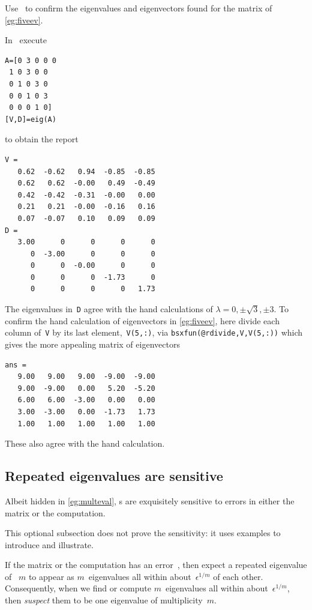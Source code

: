 \begin{example} \label{eg:fiveevm}
Use \script\ to confirm the eigenvalues and eigenvectors found for the matrix of \autoref{eg:fiveev}.
\begin{solution} 
In \script\ execute
\begin{verbatim}
A=[0 3 0 0 0
 1 0 3 0 0
 0 1 0 3 0
 0 0 1 0 3
 0 0 0 1 0]
[V,D]=eig(A)
\end{verbatim}
\setbox\ajrqrbox\hbox{}%
\marginpar{\usebox{\ajrqrbox}}%
to obtain the report \twodp
\begin{verbatim}
V =
   0.62  -0.62   0.94  -0.85  -0.85
   0.62   0.62  -0.00   0.49  -0.49
   0.42  -0.42  -0.31  -0.00   0.00
   0.21   0.21  -0.00  -0.16   0.16
   0.07  -0.07   0.10   0.09   0.09
D =
   3.00      0      0      0      0
      0  -3.00      0      0      0
      0      0  -0.00      0      0
      0      0      0  -1.73      0
      0      0      0      0   1.73
\end{verbatim}
The eigenvalues in~\verb|D| agree with the hand calculations of \(\lambda=0,\pm\sqrt3,\pm3\).
To confirm the hand calculation of eigenvectors in \autoref{eg:fiveev}, here divide each column of~\verb|V| by its last element,~\verb|V(5,:)|, via \verb|bsxfun(@rdivide,V,V(5,:))| which gives the more appealing matrix of eigenvectors \twodp
\begin{verbatim}
ans =
   9.00   9.00   9.00  -9.00  -9.00
   9.00  -9.00   0.00   5.20  -5.20
   6.00   6.00  -3.00   0.00   0.00
   3.00  -3.00   0.00  -1.73   1.73
   1.00   1.00   1.00   1.00   1.00
\end{verbatim}
These also agree with the hand calculation.
\end{solution}
\end{example}







\subsection{Repeated eigenvalues are sensitive}
\label{sec:reas}



Albeit hidden in \autoref{eg:multeval}, s are exquisitely sensitive to errors in either the matrix or the computation.
\begin{aside}
This optional subsection does not prove the sensitivity: it uses examples to introduce and illustrate.
\end{aside}
If the matrix or the computation has an error~\idx{$\epsilon$}, then expect a repeated eigenvalue of ~\(m\) to appear as \(m\)~eigenvalues all within about~\(\epsilon^{1/m}\) of each other.
Consequently, when we find or compute \(m\)~eigenvalues all within about~\(\epsilon^{1/m}\), then \emph{suspect} them to be one eigenvalue of multiplicity~\(m\).

